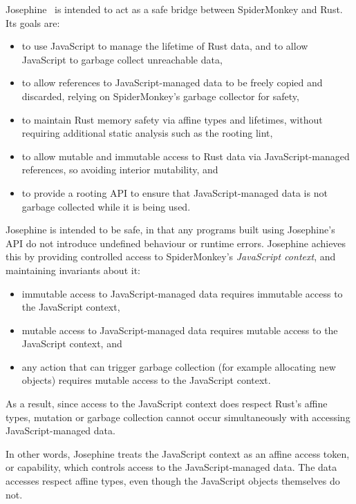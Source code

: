 Josephine~\cite{josephine} is intended to act as a safe bridge between
SpiderMonkey and Rust. Its goals are:
\begin{itemize}

\item to use JavaScript to manage the lifetime of Rust data,
  and to allow JavaScript to garbage collect unreachable data,

\item to allow references to JavaScript-managed data to be freely copied and discarded,
  relying on SpiderMonkey's garbage collector for safety,

\item to maintain Rust memory safety via affine types and lifetimes,
  without requiring additional static analysis such as the rooting lint,

\item to allow mutable and immutable access to Rust data via JavaScript-managed references,
  so avoiding interior mutability, and

\item to provide a rooting API to ensure that JavaScript-managed data is not garbage collected
  while it is being used.

\end{itemize}
Josephine is intended to be safe, in that any programs built using Josephine's API
do not introduce undefined behaviour or runtime errors.
Josephine achieves this by providing controlled access to
SpiderMonkey's \emph{JavaScript context}, and maintaining invariants about it:
\begin{itemize}

\item immutable access to JavaScript-managed data requires immutable access
  to the JavaScript context,

\item mutable access to JavaScript-managed data requires mutable access
  to the JavaScript context, and

\item any action that can trigger garbage collection (for example allocating
  new objects) requires mutable access to the JavaScript context.

\end{itemize}
As a result, since access to the JavaScript context does respect
Rust's affine types, mutation or garbage collection cannot occur
simultaneously with accessing JavaScript-managed data.

In other words, Josephine treats the JavaScript context as an affine
access token, or capability, which controls access to the JavaScript-managed
data. The data accesses respect affine types, even though the JavaScript objects
themselves do not.


